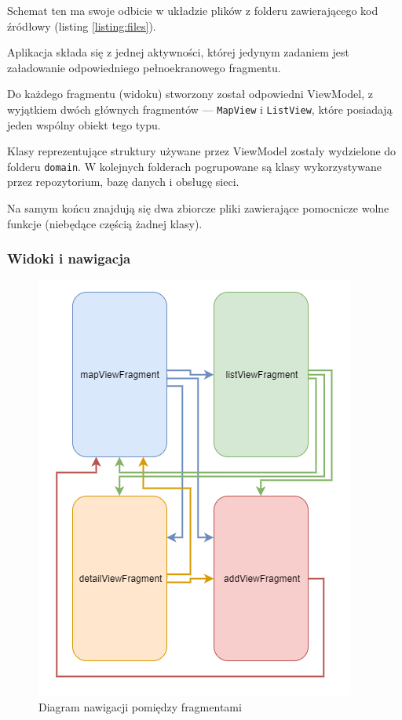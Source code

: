 \documentclass[polish,polish,a4paper,12pt]{article}
\begin{document}
		Schemat ten ma swoje odbicie w układzie plików z folderu zawierającego kod źródłowy (listing \ref{listing:files}).

		Aplikacja składa się z jednej aktywności, której jedynym zadaniem jest załadowanie odpowiedniego pełnoekranowego fragmentu.

		Do każdego fragmentu (widoku) stworzony został odpowiedni ViewModel, z wyjątkiem dwóch głównych fragmentów — \texttt{MapView} i \texttt{ListView}, które posiadają jeden wspólny obiekt tego typu.

		Klasy reprezentujące struktury używane przez ViewModel zostały wydzielone do folderu \texttt{domain}. W kolejnych folderach pogrupowane są klasy wykorzystywane przez repozytorium, bazę danych i obsługę sieci.

		Na samym końcu znajdują się dwa zbiorcze pliki zawierające pomocnicze wolne funkcje (niebędące częścią żadnej klasy).


		\subsubsection{Widoki i nawigacja}

		\begin{figure}[H]
			\centering
			\includegraphics[width = \textwidth]{navigation}
			\caption{Diagram nawigacji pomiędzy fragmentami}
			\label{fig:navigation}
		\end{figure}
\end{document}
